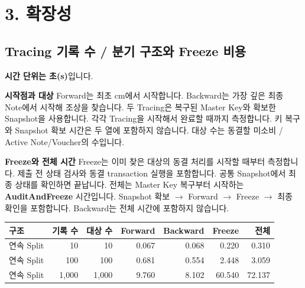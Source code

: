\documentclass[11pt,a4paper]{article}
\begin{document}
\section*{3. 확장성}
\par\noindent\begin{minipage}{\linewidth}
\subsection*{Tracing 기록 수 / 분기 구조와 Freeze 비용}
\textbf{시간 단위는 초(s)}입니다.\par\smallskip
\textbf{시작점과 대상}\newline
Forward는 최초 cm에서 시작합니다.\newline
Backward는 가장 깊은 최종 Note에서 시작해 조상을 찾습니다.\newline
두 Tracing은 복구된 Master Key와 확보한 Snapshot을 사용합니다.\newline
각각 Tracing을 시작해서 완료할 때까지 측정합니다.\newline
키 복구와 Snapshot 확보 시간은 두 열에 포함하지 않습니다.\newline
대상 수는 동결할 미소비 / Active Note/Voucher의 수입니다.\par\smallskip
\textbf{Freeze와 전체 시간}\newline
Freeze는 이미 찾은 대상의 동결 처리를 시작할 때부터 측정합니다.\newline
제출 전 상태 검사와 동결 transaction 실행을 포함합니다.\newline
공통 Snapshot에서 최종 상태를 확인하면 끝납니다.\newline
전체는 Master Key 복구부터 시작하는 \textbf{AuditAndFreeze} 시간입니다.\newline
Snapshot 확보 $\rightarrow$ Forward $\rightarrow$ Freeze $\rightarrow$ 최종 확인을 포함합니다.\newline
Backward는 전체 시간에 포함하지 않습니다.\par\smallskip
\begin{center}\small\begin{tabular}{@{}lrrrrrr@{}}\toprule
\textbf{구조} & \textbf{기록 수} & \textbf{대상 수} & \textbf{Forward} & \textbf{Backward} & \textbf{Freeze} & \textbf{전체} \\
\midrule
연속 Split & 10 & 10 & 0.067 & 0.068 & 0.220 & 0.310 \\
연속 Split & 100 & 100 & 0.681 & 0.554 & 2.448 & 3.059 \\
연속 Split & 1,000 & 1,000 & 9.760 & 8.102 & 60.540 & 72.137 \\

\end{tabular}
\end{center}
\end{minipage}
\end{document}
